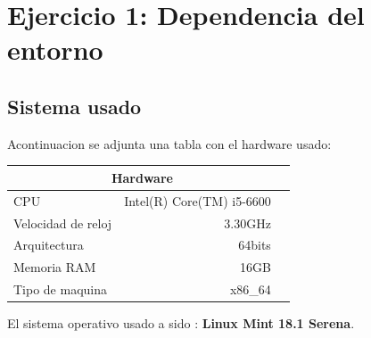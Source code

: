 \documentclass[12pt,a4psprt]{article}
\title{\fbox{\fbox{\bf Práctica 1: Eficiencia}}}
\author{Antonio Jesús Heredia Castillo\\ 2ºA \\ ETS de Ingenierías Informática y de Telecomunicación }
\date{\today}
\begin{document}
\maketitle{}
	
\begin{abstract}
En esta practica obtendremos datos sobre el tiempo de ejecucion de distintos algoritmos y como afecta la compilacion al tiempo de ejecución.
\end{abstract}



\pagebreak
\tableofcontents
\pagebreak
\section{Ejercicio 1: Dependencia del entorno}
\subsection{Sistema usado}
Acontinuacion se adjunta una tabla con el hardware usado: \\
\begin{center}
\begin{tabular}{|l||r|p{2cm}}
\hline
\multicolumn{2}{|c|}{Hardware} \\
\hline
CPU & Intel(R) Core(TM) i5-6600 \\
\hline
Velocidad de reloj & 3.30GHz \\
\hline
Arquitectura & 64bits \\
\hline
Memoria RAM & 16GB \\
\hline
Tipo de maquina & x86\_64 \\
\hline

\end{tabular}
\end{center}

El sistema operativo usado a sido : \textbf{Linux Mint 18.1 Serena}.
\end{document}
